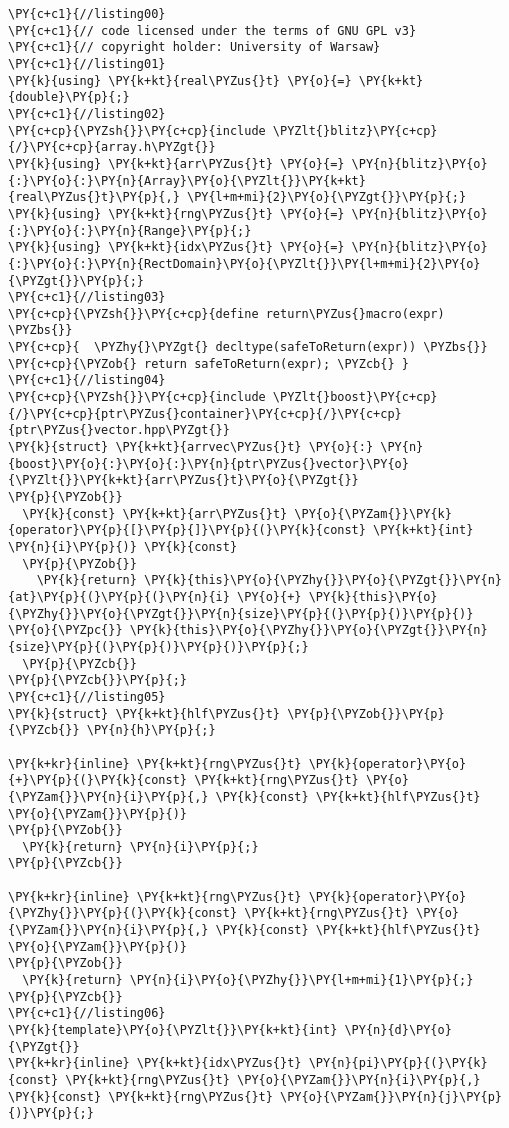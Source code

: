 \begin{Verbatim}[commandchars=\\\{\}]
\PY{c+c1}{//listing00}
\PY{c+c1}{// code licensed under the terms of GNU GPL v3}
\PY{c+c1}{// copyright holder: University of Warsaw}
\PY{c+c1}{//listing01}
\PY{k}{using} \PY{k+kt}{real\PYZus{}t} \PY{o}{=} \PY{k+kt}{double}\PY{p}{;}
\PY{c+c1}{//listing02}
\PY{c+cp}{\PYZsh{}}\PY{c+cp}{include \PYZlt{}blitz}\PY{c+cp}{/}\PY{c+cp}{array.h\PYZgt{}}
\PY{k}{using} \PY{k+kt}{arr\PYZus{}t} \PY{o}{=} \PY{n}{blitz}\PY{o}{:}\PY{o}{:}\PY{n}{Array}\PY{o}{\PYZlt{}}\PY{k+kt}{real\PYZus{}t}\PY{p}{,} \PY{l+m+mi}{2}\PY{o}{\PYZgt{}}\PY{p}{;}
\PY{k}{using} \PY{k+kt}{rng\PYZus{}t} \PY{o}{=} \PY{n}{blitz}\PY{o}{:}\PY{o}{:}\PY{n}{Range}\PY{p}{;}
\PY{k}{using} \PY{k+kt}{idx\PYZus{}t} \PY{o}{=} \PY{n}{blitz}\PY{o}{:}\PY{o}{:}\PY{n}{RectDomain}\PY{o}{\PYZlt{}}\PY{l+m+mi}{2}\PY{o}{\PYZgt{}}\PY{p}{;}
\PY{c+c1}{//listing03}
\PY{c+cp}{\PYZsh{}}\PY{c+cp}{define return\PYZus{}macro(expr) \PYZbs{}}
\PY{c+cp}{  \PYZhy{}\PYZgt{} decltype(safeToReturn(expr)) \PYZbs{}}
\PY{c+cp}{\PYZob{} return safeToReturn(expr); \PYZcb{} }
\PY{c+c1}{//listing04}
\PY{c+cp}{\PYZsh{}}\PY{c+cp}{include \PYZlt{}boost}\PY{c+cp}{/}\PY{c+cp}{ptr\PYZus{}container}\PY{c+cp}{/}\PY{c+cp}{ptr\PYZus{}vector.hpp\PYZgt{}}
\PY{k}{struct} \PY{k+kt}{arrvec\PYZus{}t} \PY{o}{:} \PY{n}{boost}\PY{o}{:}\PY{o}{:}\PY{n}{ptr\PYZus{}vector}\PY{o}{\PYZlt{}}\PY{k+kt}{arr\PYZus{}t}\PY{o}{\PYZgt{}} 
\PY{p}{\PYZob{}}
  \PY{k}{const} \PY{k+kt}{arr\PYZus{}t} \PY{o}{\PYZam{}}\PY{k}{operator}\PY{p}{[}\PY{p}{]}\PY{p}{(}\PY{k}{const} \PY{k+kt}{int} \PY{n}{i}\PY{p}{)} \PY{k}{const} 
  \PY{p}{\PYZob{}}   
    \PY{k}{return} \PY{k}{this}\PY{o}{\PYZhy{}}\PY{o}{\PYZgt{}}\PY{n}{at}\PY{p}{(}\PY{p}{(}\PY{n}{i} \PY{o}{+} \PY{k}{this}\PY{o}{\PYZhy{}}\PY{o}{\PYZgt{}}\PY{n}{size}\PY{p}{(}\PY{p}{)}\PY{p}{)} \PY{o}{\PYZpc{}} \PY{k}{this}\PY{o}{\PYZhy{}}\PY{o}{\PYZgt{}}\PY{n}{size}\PY{p}{(}\PY{p}{)}\PY{p}{)}\PY{p}{;} 
  \PY{p}{\PYZcb{}}
\PY{p}{\PYZcb{}}\PY{p}{;}
\PY{c+c1}{//listing05}
\PY{k}{struct} \PY{k+kt}{hlf\PYZus{}t} \PY{p}{\PYZob{}}\PY{p}{\PYZcb{}} \PY{n}{h}\PY{p}{;}

\PY{k+kr}{inline} \PY{k+kt}{rng\PYZus{}t} \PY{k}{operator}\PY{o}{+}\PY{p}{(}\PY{k}{const} \PY{k+kt}{rng\PYZus{}t} \PY{o}{\PYZam{}}\PY{n}{i}\PY{p}{,} \PY{k}{const} \PY{k+kt}{hlf\PYZus{}t} \PY{o}{\PYZam{}}\PY{p}{)} 
\PY{p}{\PYZob{}} 
  \PY{k}{return} \PY{n}{i}\PY{p}{;} 
\PY{p}{\PYZcb{}} 

\PY{k+kr}{inline} \PY{k+kt}{rng\PYZus{}t} \PY{k}{operator}\PY{o}{\PYZhy{}}\PY{p}{(}\PY{k}{const} \PY{k+kt}{rng\PYZus{}t} \PY{o}{\PYZam{}}\PY{n}{i}\PY{p}{,} \PY{k}{const} \PY{k+kt}{hlf\PYZus{}t} \PY{o}{\PYZam{}}\PY{p}{)} 
\PY{p}{\PYZob{}} 
  \PY{k}{return} \PY{n}{i}\PY{o}{\PYZhy{}}\PY{l+m+mi}{1}\PY{p}{;} 
\PY{p}{\PYZcb{}}
\PY{c+c1}{//listing06}
\PY{k}{template}\PY{o}{\PYZlt{}}\PY{k+kt}{int} \PY{n}{d}\PY{o}{\PYZgt{}} 
\PY{k+kr}{inline} \PY{k+kt}{idx\PYZus{}t} \PY{n}{pi}\PY{p}{(}\PY{k}{const} \PY{k+kt}{rng\PYZus{}t} \PY{o}{\PYZam{}}\PY{n}{i}\PY{p}{,} \PY{k}{const} \PY{k+kt}{rng\PYZus{}t} \PY{o}{\PYZam{}}\PY{n}{j}\PY{p}{)}\PY{p}{;}


\end{Verbatim}
